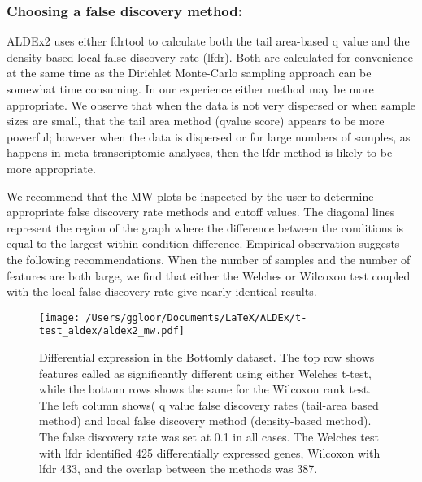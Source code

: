 \documentclass[11pt]{amsart}
\begin{document}
\subsubsection*{Choosing a false discovery method:} ALDEx2 uses either fdrtool to calculate both the tail area-based q value and the density-based local false discovery rate (lfdr). Both are calculated for convenience at the same time as the Dirichlet Monte-Carlo sampling approach can be somewhat time consuming. In our experience either method may be more appropriate. We observe that when the data is not very dispersed or when sample sizes are small, that the tail area method (qvalue score) appears to be more powerful; however when the data is dispersed or for large numbers of samples, as happens in meta-transcriptomic analyses, then the lfdr method is likely to be more appropriate. %

We recommend that the MW plots  be inspected by the user to determine appropriate false discovery rate methods and cutoff values. The diagonal lines represent the region of the graph where the difference between the conditions is equal to the largest within-condition difference\cite{fernandes:2013}. Empirical observation suggests the following recommendations. When the number of samples and the number of features are both large, we find that either the Welches or Wilcoxon test coupled with the local false discovery rate give nearly identical results. 

\begin{wrapfigure}{r}{0.75\textwidth}\vspace{-1cm}
\begin{center}
\texttt{[image: /Users/ggloor/Documents/LaTeX/ALDEx/t-test\_aldex/aldex2\_mw.pdf]}
\caption{Differential expression in the Bottomly dataset. The top row shows features called as significantly different using either Welches t-test, while the bottom rows shows the same for the Wilcoxon rank test. The left column shows( q value false discovery rates (tail-area based method) and local false discovery method (density-based method). The false discovery rate was set at 0.1 in all cases. The Welches test with lfdr identified 425 differentially expressed genes, Wilcoxon with lfdr 433, and the overlap between the methods was 387.}
\label{bottomly2}
\end{center}
\end{wrapfigure}
\end{document}
